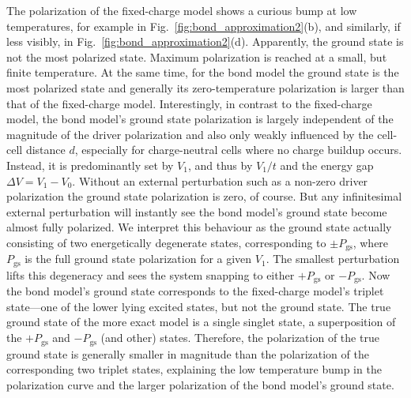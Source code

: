 The polarization of the fixed-charge model shows a curious bump at low
temperatures, for example in Fig.~\ref{fig:bond_approximation2}(b), and
similarly, if less visibly, in Fig.~\ref{fig:bond_approximation2}(d).
Apparently, the ground state is not the most polarized state. Maximum
polarization is reached at a small, but finite temperature. At the same time,
for the bond model the ground state is the most polarized state and generally
its zero-temperature polarization is larger than that of the fixed-charge model.
Interestingly, in contrast to the fixed-charge model, the bond model's ground
state polarization is largely independent of the magnitude of the driver
polarization and also only weakly influenced by the cell-cell distance $d$,
especially for charge-neutral cells where no charge buildup occurs. Instead, it
is predominantly set by $V_1$, and thus by $V_1/t$ and the energy gap $\Delta V
= V_1 - V_0$. Without an external perturbation such as a non-zero driver
polarization the ground state polarization is zero, of course. But any
infinitesimal external perturbation will instantly see the bond model's ground
state become almost fully polarized. We interpret this behaviour as the ground
state actually consisting of two energetically degenerate states, corresponding
to $\pm P_{\textrm{gs}}$, where $P_{\textrm{gs}}$ is the full ground state
polarization for a given $V_1$. The smallest perturbation lifts this degeneracy
and sees the system snapping to either $+P_{\textrm{gs}}$ or $-P_{\textrm{gs}}$.
Now the bond model's ground state corresponds to the fixed-charge model's
triplet state---one of the lower lying excited states, but not the ground state.
The true ground state of the more exact model is a single singlet state, a
superposition of the $+P_{\textrm{gs}}$ and $-P_{\textrm{gs}}$ (and other)
states. Therefore, the polarization of the true ground state is generally
smaller in magnitude than the polarization of the corresponding two triplet
states, explaining the low temperature bump in the polarization curve and the
larger polarization of the bond model's ground state.

